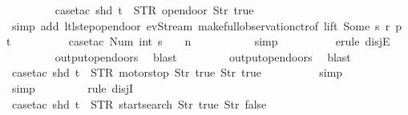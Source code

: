 \begin{isabellebody}
\ \ \ \ \ \ \ \isamarkupfalse%
\ {\isacharparenleft}case{\isacharunderscore}tac\ {\isachardoublequoteopen}shd\ t\ {\isacharequal}\ {\isacharparenleft}STR\ {\isacharprime}{\isacharprime}opendoor{\isacharprime}{\isacharprime}{\isacharcomma}\ {\isacharbrackleft}Str\ {\isacharprime}{\isacharprime}true{\isacharprime}{\isacharprime}{\isacharbrackright}{\isacharparenright}{\isachardoublequoteclose}{\isacharparenright}\isanewline
\ \ \ \ \ \ \ \ \isamarkupfalse%
\ {\isacharparenleft}simp\ add{\isacharcolon}\ ltl{\isacharunderscore}step{\isacharunderscore}opendoor\ ev{\isacharunderscore}Stream\ make{\isacharunderscore}full{\isacharunderscore}observation{\isachardot}ctr{\isacharbrackleft}of\ lift\ {\isachardoublequoteopen}Some\ s{\isachardoublequoteclose}\ r\ p\ t{\isacharbrackright}{\isacharparenright}\isanewline
\ \ \ \ \ \ \ \ \isamarkupfalse%
\ {\isacharparenleft}case{\isacharunderscore}tac\ {\isachardoublequoteopen}Num\ {\isacharparenleft}int\ {\isacharparenleft}s\ {\isacharminus}\ {}{\isacharparenright}{\isacharparenright}\ {\isacharequal}\ n{\isachardoublequoteclose}{\isacharparenright}\isanewline
\ \ \ \ \ \ \ \ \ \isamarkupfalse%
\ simp\isanewline
\ \ \ \ \ \ \ \ \isamarkupfalse%
\ {\isacharparenleft}erule\ disjE{\isacharparenright}\isanewline
\ \ \ \ \ \ \ \isamarkupfalse%
\ output{\isacharunderscore}opendoors\ \isamarkupfalse%
\ blast\isanewline
\ \ \ \ \ \ \ \isamarkupfalse%
\ output{\isacharunderscore}opendoors\ \isamarkupfalse%
\ blast\isanewline
\ \ \ \ \ \ \ \isamarkupfalse%
\ {\isacharparenleft}case{\isacharunderscore}tac\ {\isachardoublequoteopen}{\isacharparenleft}shd\ t{\isacharparenright}\ {\isacharequal}\ {\isacharparenleft}STR\ {\isacharprime}{\isacharprime}motorstop{\isacharprime}{\isacharprime}{\isacharcomma}\ {\isacharbrackleft}Str\ {\isacharprime}{\isacharprime}true{\isacharprime}{\isacharprime}{\isacharcomma}\ Str\ {\isacharprime}{\isacharprime}true{\isacharprime}{\isacharprime}{\isacharbrackright}{\isacharparenright}{\isachardoublequoteclose}{\isacharparenright}\isanewline
\ \ \ \ \ \ \ \ \isamarkupfalse%
\ simp\isanewline
\ \ \ \ \ \ \ \isamarkupfalse%
\ simp\isanewline
\ \ \ \ \ \ \ \isamarkupfalse%
\ {\isacharparenleft}rule\ disjI{}{\isacharparenright}\isanewline
\ \ \ \ \ \ \ \isamarkupfalse%
\ {\isacharparenleft}case{\isacharunderscore}tac\ {\isachardoublequoteopen}{\isacharparenleft}shd\ t{\isacharparenright}\ {\isacharequal}\ {\isacharparenleft}STR\ {\isacharprime}{\isacharprime}startsearch{\isacharprime}{\isacharprime}{\isacharcomma}\ {\isacharbrackleft}Str\ {\isacharprime}{\isacharprime}true{\isacharprime}{\isacharprime}{\isacharcomma}\ Str\ {\isacharprime}{\isacharprime}false{\isacharprime}{\isacharprime}{\isacharbrackright}{\isacharparenright}{\isachardoublequoteclose}{\isacharparenright}\isanewline

\end{isabellebody}

